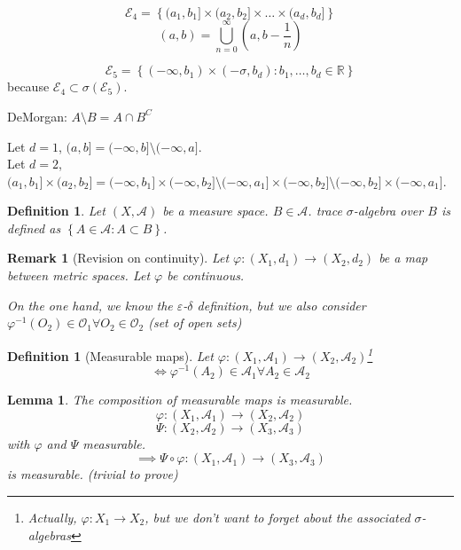 \documentclass[a4paper]{article}
\newcounter{lecref}[section]
\numberwithin{lecref}{section}
\theoremstyle{break}
\newtheorem{definition}[lecref]{Definition}
\newtheorem{lemma}[lecref]{Lemma}
\newtheorem*{Remark}{Remark}
\newcommand{\Set}[1]{\left\{#1\right\}}
\begin{document}
\[ \mathcal E_4 = \Set{(a_1, b_1] \times (a_2, b_2] \times \dots \times (a_d, b_d]} \]
\[ (a, b) = \bigcup_{n=0}^\infty (a, b - \frac1n) \]

\[ \mathcal E_5 = \Set{(-\infty, b_1) \times (-\sigma, b_d): b_1, \dots, b_d \in \mathbb R} \]
because $\mathcal E_4 \subset \sigma(\mathcal E_5)$.

DeMorgan: $A \setminus B = A \cap B^C$

Let $d = 1$, $(a, b] = (-\infty, b] \setminus (-\infty, a]$. \\
Let $d = 2$, $(a_1, b_1] \times (a_2, b_2] = (-\infty, b_1] \times (-\infty, b_2] \setminus (-\infty, a_1] \times (-\infty, b_2] \setminus (-\infty, b_2] \times (-\infty, a_1]$.

\begin{definition}
  Let $(X, \mathcal A)$ be a measure space. $B \in \mathcal A$.
  trace $\sigma$-algebra over $B$ is defined as $\Set{A \in \mathcal A: A \subset B}$.
\end{definition}

\begin{Remark}[Revision on continuity]
  Let $\varphi: (X_1, d_1) \to (X_2, d_2)$ be a map between metric spaces.
  Let $\varphi$ be continuous.

  On the one hand, we know the $\varepsilon$-$\delta$ definition,
  but we also consider $\varphi^{-1}(O_2) \in \mathcal O_1 \forall O_2 \in \mathcal O_2$ (set of open sets)
\end{Remark}

\begin{definition}[Measurable maps]
  Let $\varphi: (X_1, \mathcal A_1) \to (X_2, \mathcal A_2)$\footnote{Actually, $\varphi: X_1 \to X_2$, but we don't want to forget about the associated $\sigma$-algebras}
  \[ \iff \varphi^{-1}(A_2) \in \mathcal A_1 \forall A_2 \in \mathcal A_2 \]
\end{definition}

\begin{lemma}
  \label{lem1}
  The composition of measurable maps is measurable.
  \[ \varphi: (X_1, \mathcal A_1) \to (X_2, \mathcal A_2) \]
  \[ \Psi: (X_2, \mathcal A_2) \to (X_3, \mathcal A_3) \]
  with $\varphi$ and $\Psi$ measurable.
  \[ \implies \Psi \circ \varphi: (X_1, \mathcal A_1) \to (X_3, \mathcal A_3) \]
  is measurable. (trivial to prove)
\end{lemma}
\end{document}

